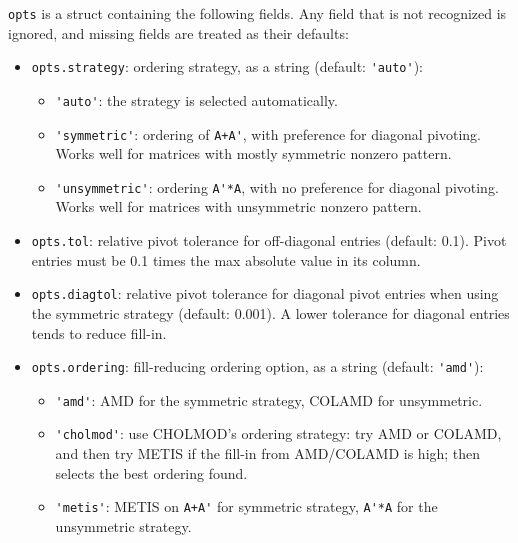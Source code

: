 \documentclass[12pt]{article}
\begin{document}
\verb'opts' is a struct containing the following fields.  Any field that is not
recognized is ignored, and missing fields are treated as their defaults:

\begin{itemize}

    \item \verb'opts.strategy':  ordering strategy,
        as a string (default: \verb"'auto'"):

        \begin{itemize}
        \item \verb"'auto'": the strategy is selected automatically.
        \item \verb"'symmetric'": ordering of \verb"A+A'", with preference for
            diagonal pivoting.  Works well for matrices with mostly symmetric
            nonzero pattern.
        \item \verb"'unsymmetric'": ordering \verb"A'*A", with no preference
            for diagonal pivoting.  Works well for matrices with unsymmetric
            nonzero pattern.
        \end{itemize}

    \item \verb'opts.tol':   relative pivot tolerance for off-diagonal entries
    (default: 0.1).  Pivot entries must be 0.1 times the max absolute value in
    its column.

    \item \verb'opts.diagtol':   relative pivot tolerance for diagonal pivot
    entries when using the symmetric strategy (default: 0.001).  A lower
    tolerance for diagonal entries tends to reduce fill-in.

    \item \verb'opts.ordering':  fill-reducing ordering option, as a string
    (default: \verb"'amd'"):

        \begin{itemize}
        \item \verb"'amd'": AMD for the symmetric strategy, COLAMD for
        unsymmetric.

        \item \verb"'cholmod'": use CHOLMOD's ordering strategy: try AMD or
        COLAMD, and then try METIS if the fill-in from AMD/COLAMD is high; then
        selects the best ordering found.

        \item \verb"'metis'": METIS on \verb"A+A'" for symmetric strategy,
            \verb"A'*A" for the unsymmetric strategy.


\end{itemize}
\end{itemize}
\end{document}
